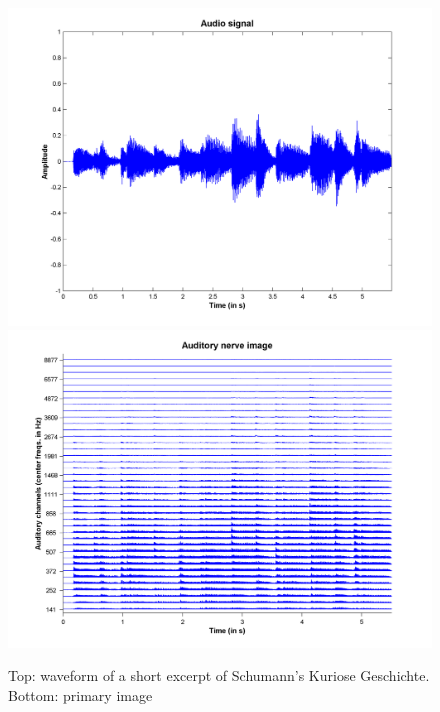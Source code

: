 \begin{figure}[h]
    \centering
    \includegraphics[width=\IPEMDefaultFigureWidth]{Graphics/SchumannAudioSignal}
    \includegraphics[width=\IPEMDefaultFigureWidth]{Graphics/SchumannANI}
    \caption{Top: waveform of a short excerpt of Schumann's Kuriose Geschichte. Bottom: primary image}
    \label{Fig:SchumannANIandAudioSignal}
\end{figure}

